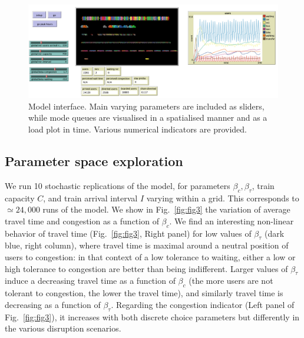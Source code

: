 \documentclass[3p,times,procedia]{elsarticle}
\begin{document}
\begin{figure}%
\begin{mdframed}
\centerline{\includegraphics[width=\linewidth]{figures/Fig2.png}}
\end{mdframed}
\caption{Model interface. Main varying parameters are included as sliders, while mode queues are visualised in a spatialised manner and as a load plot in time. Various numerical indicators are provided.\label{fig:fig2}}
\end{figure}

\subsection{Parameter space exploration}

We run 10 stochastic replications of the model, for parameters $\beta_c,\beta_{\tau}$, train capacity $C$, and train arrival interval $I$ varying within a grid. This corresponds to $\simeq 24,000$ runs of the model. We show in Fig.~\ref{fig:fig3} the variation of average travel time and congestion as a function of $\beta_c$. We find an interesting non-linear behavior of travel time (Fig.~\ref{fig:fig3}, Right panel) for low values of $\beta_{\tau}$ (dark blue, right column), where travel time is maximal around a neutral position of users to congestion: in that context of a low tolerance to waiting, either a low or high tolerance to congestion are better than being indifferent. Larger values of $\beta_{\tau}$ induce a decreasing travel time as a function of $\beta_c$ (the more users are not tolerant to congestion, the lower the travel time), and similarly travel time is decreasing as a function of $\beta_{\tau}$. Regarding the congestion indicator (Left panel of Fig.~\ref{fig:fig3}), it increases with both discrete choice parameters but differently in the various disruption scenarios.
\end{document}
